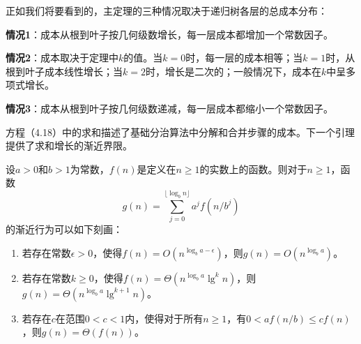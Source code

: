 \documentclass[lang=cn,newtx,10pt,scheme=chinese]{elegantbook}
\begin{document}
正如我们将要看到的，主定理的三种情况取决于递归树各层的总成本分布：

\textbf{情况1}：成本从根到叶子按几何级数增长，每一层成本都增加一个常数因子。

\textbf{情况2}：成本取决于定理中$k$的值。当$k=0$时，每一层的成本相等；当$k=1$时，从根到叶子成本线性增长；当$k=2$时，增长是二次的；一般情况下，成本在$k$中呈多项式增长。

\textbf{情况3}：成本从根到叶子按几何级数递减，每一层成本都缩小一个常数因子。

方程（4.18）中的求和描述了基础分治算法中分解和合并步骤的成本。下一个引理提供了求和增长的渐近界限。

\begin{lemma}{}{}
设$a>0$和$b>1$为常数，$f(n)$是定义在$n\geq1$的实数上的函数。则对于$n\geq1$，函数
$$
g(n)=\sum_{j=0}^{\lfloor\log _b n\rfloor} a^j f(n / b^j)
$$
的渐近行为可以如下刻画：
\begin{enumerate}
\item 若存在常数$\epsilon>0$，使得$f(n)=O(n^{\log _b a-\epsilon})$，则$g(n)=O(n^{\log _b a})$。
\item 若存在常数$k \geq 0$，使得$f(n)=\Theta(n^{\log _b a} \lg ^k n)$，则$g(n)=\Theta(n^{\log _b a} \lg ^{k+1} n)$。
\item 若存在$c$在范围$0<c<1$内，使得对于所有$n\geq1$，有$0<af(n/b) \leq cf(n)$，则$g(n)=\Theta(f(n))$。
\end{enumerate}
\end{lemma}
\end{document}
